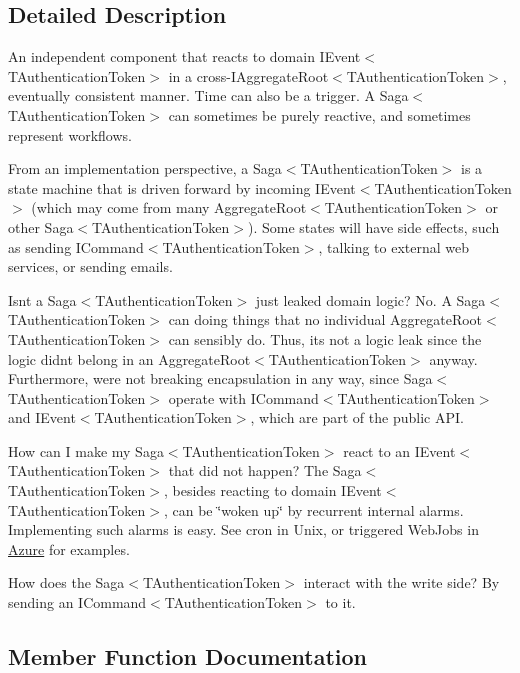 \subsection{Detailed Description}
An independent component that reacts to domain I\+Event$<$\+T\+Authentication\+Token$>$ in a cross-\/I\+Aggregate\+Root$<$\+T\+Authentication\+Token$>$, eventually consistent manner. Time can also be a trigger. A Saga$<$\+T\+Authentication\+Token$>$ can sometimes be purely reactive, and sometimes represent workflows. 

From an implementation perspective, a Saga$<$\+T\+Authentication\+Token$>$ is a state machine that is driven forward by incoming I\+Event$<$\+T\+Authentication\+Token$>$ (which may come from many Aggregate\+Root$<$\+T\+Authentication\+Token$>$ or other Saga$<$\+T\+Authentication\+Token$>$). Some states will have side effects, such as sending I\+Command$<$\+T\+Authentication\+Token$>$, talking to external web services, or sending emails. 

Isn\textquotesingle{}t a Saga$<$\+T\+Authentication\+Token$>$ just leaked domain logic? No. A Saga$<$\+T\+Authentication\+Token$>$ can doing things that no individual Aggregate\+Root$<$\+T\+Authentication\+Token$>$ can sensibly do. Thus, it\textquotesingle{}s not a logic leak since the logic didn\textquotesingle{}t belong in an Aggregate\+Root$<$\+T\+Authentication\+Token$>$ anyway. Furthermore, we\textquotesingle{}re not breaking encapsulation in any way, since Saga$<$\+T\+Authentication\+Token$>$ operate with I\+Command$<$\+T\+Authentication\+Token$>$ and I\+Event$<$\+T\+Authentication\+Token$>$, which are part of the public A\+PI.

How can I make my Saga$<$\+T\+Authentication\+Token$>$ react to an I\+Event$<$\+T\+Authentication\+Token$>$ that did not happen? The Saga$<$\+T\+Authentication\+Token$>$, besides reacting to domain I\+Event$<$\+T\+Authentication\+Token$>$, can be \char`\"{}woken up\char`\"{} by recurrent internal alarms. Implementing such alarms is easy. See cron in Unix, or triggered Web\+Jobs in \hyperlink{namespaceCqrs_1_1Azure}{Azure} for examples.

How does the Saga$<$\+T\+Authentication\+Token$>$ interact with the write side? By sending an I\+Command$<$\+T\+Authentication\+Token$>$ to it. 

\subsection{Member Function Documentation}
\mbox{\label{interfaceCqrs_1_1Domain_1_1ISaga_abb77811b4f7d19adb61f9d33da18e7e0}} 
